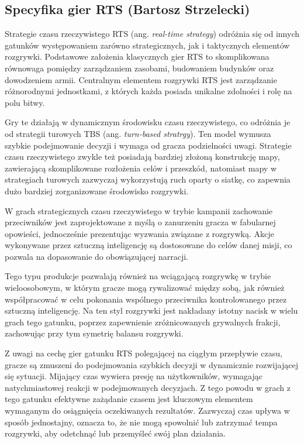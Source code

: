 \subsection{Specyfika gier RTS (Bartosz Strzelecki)}\label{ss:rts}
Strategie czasu rzeczywistego RTS (ang. \textit{real-time strategy}) odróżnia się od innych gatunków występowaniem zarówno strategicznych, jak i taktycznych
elementów rozgrywki. Podstawowe założenia klasycznych gier RTS to skomplikowana równowaga pomiędzy zarządzaniem zasobami, budowaniem budynków oraz
dowodzeniem armii. Centralnym elementem rozgrywki RTS jest zarządzanie różnorodnymi jednostkami, z których każda posiada unikalne zdolności i rolę na polu bitwy.

Gry te działają w dynamicznym środowisku czasu rzeczywistego, co odróżnia je od strategii turowych TBS (ang.  \textit{turn-based stratrgy}). Ten model wymusza szybkie podejmowanie decyzji
i wymaga od gracza podzielności uwagi. Strategie czasu rzeczywistego zwykle też posiadają bardziej złożoną konstrukcję mapy, zawierającą skomplikowane
rozłożenia celów i przeszkód, natomiast mapy w strategiach turowych zazwyczaj wykorzystują ruch oparty o siatkę, co zapewnia dużo bardziej
zorganizowane środowisko rozgrywki.

W grach strategicznych czasu rzeczywistego w trybie kampanii zachowanie przeciwników jest zaprojektowane z myślą o zanurzeniu gracza w fabularnej opowieści, jednocześnie
prezentując wyzwania związane z rozgrywką. Akcje wykonywane przez sztuczną inteligencję są dostosowane do celów danej misji, co pozwala
na dopasowanie do obowiązującej narracji.

Tego typu produkcje pozwalają również na wciągającą rozgrywkę w trybie wieloosobowym, w którym gracze mogą rywalizować między sobą, jak również
współpracować w celu pokonania wspólnego przeciwnika kontrolowanego przez sztuczną inteligencję. Na ten styl rozgrywki jest nakładany istotny nacisk
w wielu grach tego gatunku, poprzez zapewnienie zróżnicowanych grywalnych frakcji, zachowując przy tym symetrię balansu rozgrywki.

Z uwagi na cechę gier gatunku RTS polegającej na ciągłym przepływie czasu, gracze są zmuszeni
do podejmowania szybkich decyzji w dynamicznie rozwijającej się sytuacji. Mijający czas
wywiera presję na użytkowników, wymagając natychmiastowej reakcji w podejmowanych decyzjach.
Z tego powodu w grach z tego gatunku efektywne zażądanie czasem jest kluczowym elementem
wymaganym do osiągnięcia oczekiwanych rezultatów. Zazwyczaj czas upływa w sposób jednostajny, oznacza to, że
nie mogą spowolnić lub zatrzymać tempa rozgrywki, aby odetchnąć lub przemyśleć swój plan działania.


